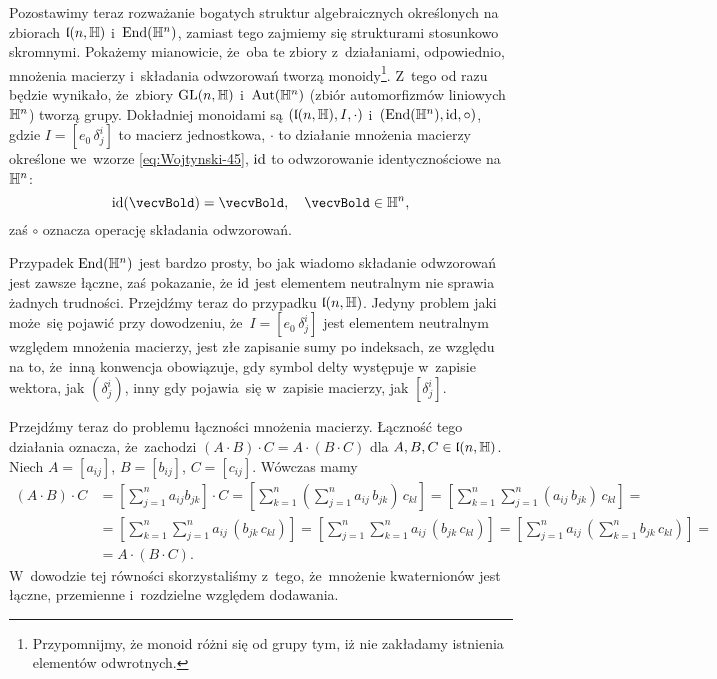 \documentclass[a4paper,11pt]{article}
\numberwithin{equation}{section}
\begin{document}
Pozostawimy teraz rozważanie bogatych struktur algebraicznych określonych
na zbiorach $\mathfrak{l}( n, \mathbb{H} )$ i~$\mathrm{End}( \mathbb{H}^{ n } )$, zamiast tego
zajmiemy się strukturami stosunkowo skromnymi. Pokażemy mianowicie, że~oba
te zbiory z~działaniami, odpowiednio, mnożenia macierzy i~składania
odwzorowań tworzą monoidy\footnote{Przypomnijmy, że monoid różni się od
  grupy tym, iż nie zakładamy istnienia elementów odwrotnych.}. Z~tego od
razu będzie wynikało, że~zbiory $\mathrm{GL}( n, \mathbb{H} )$ i~$\mathrm{Aut}( \mathbb{H}^{ n } )$
(zbiór automorfizmów liniowych $\mathbb{H}^{ n }$) tworzą grupy. Dokładniej
monoidami są $( \mathfrak{l}( n, \mathbb{H} ), I, \cdot )$
i~$( \mathrm{End}( \mathbb{H}^{ n } ), \mathrm{id}, \circ )$, gdzie $I = [ e_{ 0 } \, \delta^{ i }_{ j } ]$ to
macierz jednostkowa, $\cdot$ to działanie mnożenia macierzy określone we~wzorze
\eqref{eq:Wojtynski-45}, $\mathrm{id}$ to odwzorowanie identycznościowe
na~$\mathbb{H}^{ n }$:
\begin{equation}
  \label{eq:Wojtynski-80}
  \id( \vecvBold ) = \vecvBold, \quad \vecvBold \in \Hbb^{ n },
\end{equation}
zaś $\circ$ oznacza operację składania odwzorowań.

Przypadek $\mathrm{End}( \mathbb{H}^{ n } )$ jest bardzo prosty, bo jak wiadomo składanie
odwzorowań jest zawsze łączne, zaś pokazanie, że $\mathrm{id}$ jest elementem
neutralnym nie sprawia żadnych trudności. Przejdźmy teraz do przypadku
$\mathfrak{l}( n, \mathbb{H} )$. Jedyny problem jaki może~się pojawić przy dowodzeniu,
że~$I = [ e_{ 0 } \, \delta^{ i }_{ j } ]$ jest elementem neutralnym względem
mnożenia macierzy, jest złe zapisanie sumy po indeksach, ze względu na to,
że~inną konwencja obowiązuje, gdy symbol delty występuje w~zapisie wektora,
jak $( \delta^{ i }_{ j } )$, inny gdy pojawia~się w~zapisie macierzy,
jak $[ \delta^{ i }_{ j } ]$.

Przejdźmy teraz do problemu łączności mnożenia macierzy. Łączność tego
działania oznacza, że~zachodzi $( A \cdot B ) \cdot C = A \cdot ( B \cdot C )$ dla
$A, B, C \in \mathfrak{l}( n, \mathbb{H} )$. Niech $A = [ a_{ i j } ]$, $B = [ b_{ i j } ]$,
$C = [ c_{ i j } ]$. Wówczas mamy
\begin{equation}
  \label{eq:Wojtynski-81}
  \begin{split}
    ( A \cdot B ) \cdot C
    &=
      \left[ \sum_{ j = 1 }^{ n } a_{ i j } b_{ j k } \right] \cdot C =
      \left[ \sum_{ k = 1 }^{ n } \left( \sum_{ j = 1 }^{ n } a_{ i j } \,
      b_{ j k } \right) \, c_{ k l } \right] =
      \left[ \sum_{ k = 1 }^{ n } \sum_{ j = 1 }^{ n } ( a_{ i j } \, b_{ j k } ) \,
      c_{ k l } \right] = \\[0.4em]
    &=
      \left[ \sum_{ k = 1 }^{ n } \sum_{ j = 1 }^{ n } a_{ i j } \, ( b_{ j k } \,
      c_{ k l } ) \right] =
      \left[ \sum_{ j = 1 }^{ n } \sum_{ k = 1 }^{ n } a_{ i j } \, ( b_{ j k } \,
      c_{ k l } ) \right] =
      \left[ \sum_{ j = 1 }^{ n } a_{ i j } \,
      \left( \sum_{ k = 1 }^{ n } b_{ j k } \, c_{ k l } \right) \right]
      = \\[0.4em]
    &=
      A \cdot ( B \cdot C ).
  \end{split}
\end{equation}
W~dowodzie tej równości skorzystaliśmy z~tego, że~mnożenie kwaternionów
jest łączne, przemienne i~rozdzielne względem dodawania.
\end{document}
